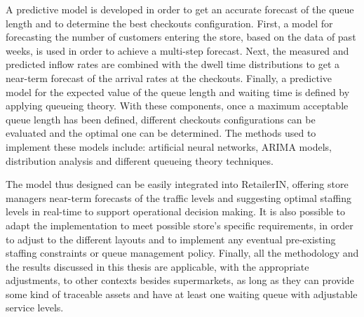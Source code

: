 A predictive model is developed in order to get an accurate forecast of the queue length and to determine the best checkouts configuration. First, a model for forecasting the number of customers entering the store, based on the data of past weeks, is used in order to achieve a multi-step forecast. Next, the measured and predicted inflow rates are combined with the dwell time distributions to get a near-term forecast of the arrival rates at the checkouts. Finally, a predictive model for the expected value of the queue length and waiting time is defined by applying queueing theory. With these components, once a maximum acceptable queue length has been defined, different checkouts configurations can be evaluated and the optimal one can be determined. The methods used to implement these models include: artificial neural networks, ARIMA models, distribution analysis and different queueing theory techniques.

The model thus designed can be easily integrated into RetailerIN, offering store managers near-term forecasts of the traffic levels and suggesting optimal staffing levels in real-time to support operational decision making. It is also possible to adapt the implementation to meet possible store’s specific requirements, in order to adjust to the different layouts and to implement any eventual pre-existing staffing constraints or queue management policy. Finally, all the methodology and the results discussed in this thesis are applicable, with the appropriate adjustments, to other contexts besides supermarkets, as long as they can provide some kind of traceable assets and have at least one waiting queue with adjustable service levels.

\clearpage